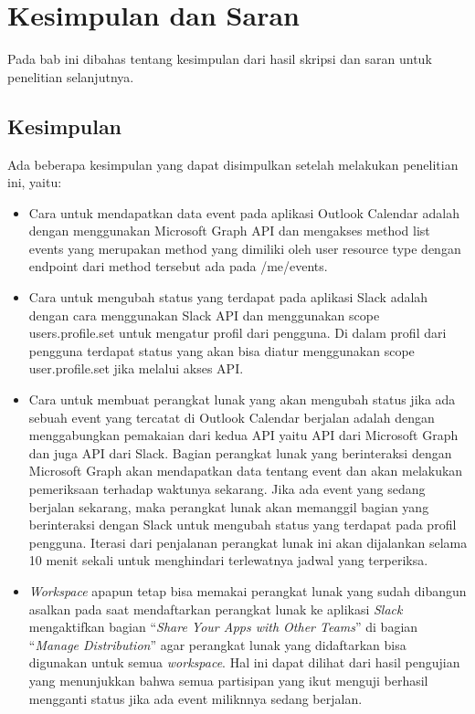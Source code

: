 \chapter{Kesimpulan dan Saran}
\label{chap:kesimpulan dan saran}

Pada bab ini dibahas tentang kesimpulan dari hasil skripsi dan saran untuk penelitian selanjutnya. 

\section{Kesimpulan}
Ada beberapa kesimpulan yang dapat disimpulkan setelah melakukan penelitian ini, yaitu:
\begin{itemize}
    \item Cara untuk mendapatkan data event pada aplikasi Outlook Calendar adalah dengan menggunakan Microsoft Graph API dan mengakses method list events yang merupakan method yang dimiliki oleh user resource type dengan endpoint dari method tersebut ada pada /me/events. 
    \item Cara untuk mengubah status yang terdapat pada aplikasi Slack adalah dengan cara menggunakan Slack API dan menggunakan scope users.profile.set untuk mengatur profil dari pengguna. Di dalam profil dari pengguna terdapat status yang akan bisa diatur menggunakan scope user.profile.set jika melalui akses API. 
    \item Cara untuk membuat perangkat lunak yang akan mengubah status jika ada sebuah event yang tercatat di Outlook Calendar berjalan adalah dengan menggabungkan pemakaian dari kedua API yaitu API dari Microsoft Graph dan juga API dari Slack. Bagian perangkat lunak yang berinteraksi dengan Microsoft Graph akan mendapatkan data tentang event dan akan melakukan pemeriksaan terhadap waktunya sekarang. Jika ada event yang sedang berjalan sekarang, maka perangkat lunak akan memanggil bagian yang berinteraksi dengan Slack untuk mengubah status yang terdapat pada profil pengguna. Iterasi dari penjalanan perangkat lunak ini akan dijalankan selama 10 menit sekali untuk menghindari terlewatnya jadwal yang terperiksa. 
    \item \textit{Workspace} apapun tetap bisa memakai perangkat lunak yang sudah dibangun asalkan pada saat mendaftarkan perangkat lunak ke aplikasi \textit{Slack} mengaktifkan bagian ``\textit{Share Your Apps with Other Teams}'' di bagian ``\textit{Manage Distribution}'' agar perangkat lunak yang didaftarkan bisa digunakan untuk semua \textit{workspace}. Hal ini dapat dilihat dari hasil pengujian yang menunjukkan bahwa semua partisipan yang ikut menguji berhasil mengganti status jika ada event miliknnya sedang berjalan. 
\end{itemize}
